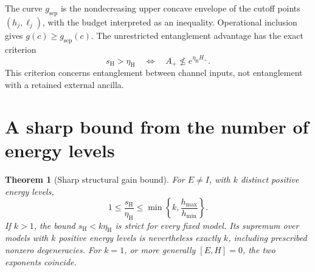 \documentclass[11pt,a4paper]{article}
\newtheorem{theorem}{Theorem}[section]
\theoremstyle{remark}
\newcommand{\hp}{H_+}
\newcommand{\sh}{s_{\mathrm H}}
\newcommand{\etah}{\eta_{\mathrm H}}
\newcommand{\gs}{g_{\mathrm{sep}}}
\begin{document}
The curve \(\gs\) is the nondecreasing upper concave envelope of the cutoff
points \((h_j,\ell_j)\), with the budget interpreted as an inequality.
Operational inclusion gives \(g(c)\geq\gs(c)\).
The unrestricted entanglement advantage has the exact criterion
\begin{equation}\label{eq:criterion}
 \sh>\etah\quad\Longleftrightarrow\quad
 A_+\not\leq e^{\etah\hp}.
\end{equation}
This criterion concerns entanglement between channel inputs, not
entanglement with a retained external ancilla.

\section{A sharp bound from the number of energy levels}
\begin{theorem}[Sharp structural gain bound]\label{thm:gain}
For \(E\ne I\), with \(k\) distinct positive energy levels,
\begin{equation}\label{eq:gain}
 1\leq\frac{\sh}{\etah}
 \leq\min\left\{k,\frac{h_{\max}}{h_{\min}}\right\}.
\end{equation}
If \(k>1\), the bound \(\sh<k\etah\) is strict for every fixed model.
Its supremum over models with \(k\) positive energy levels is nevertheless
exactly \(k\), including prescribed nonzero degeneracies.
For \(k=1\), or more generally \([E,H]=0\), the two exponents coincide.
\end{theorem}
\end{document}
